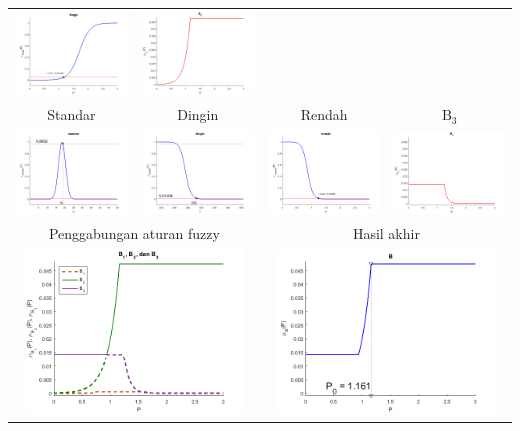 \begin{contoh}
\begin{table}[t!]
\begin{tabular} {cccc}
    \includegraphics[width=3.1cm]{P_tinggi} & \includegraphics[width=3.1cm]{B2} \\
    Standar & Dingin & Rendah & $\text{B}_3$\\
    \includegraphics[width=3.1cm]{V_standar} & \includegraphics[width=3.1cm]{T_dingin} &
    \includegraphics[width=3.1cm]{P_rendah} & \includegraphics[width=3.1cm]{B3} \\
    \midrule
    \multicolumn{2}{c}{Penggabungan aturan fuzzy} & \multicolumn{2}{c}{Hasil akhir}\\
    \multicolumn{2}{c}{\includegraphics[width=5.8cm]{B}} & \multicolumn{2}{c}{\includegraphics[width=5.8cm]{hasilB}}\\

\end{tabular}
\end{table}
\end{contoh}
